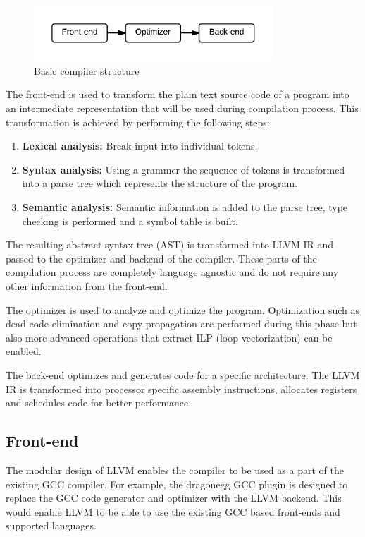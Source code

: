 \begin{figure}[ht]
\centering
\includegraphics[width=0.8\textwidth]{2_background/img/Basic_compiler.png}
\caption{Basic compiler structure}
\label{fig:compiler_structure}
\end{figure}

The front-end is used to transform the plain text source code of a program into an intermediate representation that will be used during compilation process. This transformation is achieved by performing the following steps:

\begin{enumerate}
	\item \textbf{Lexical analysis:} Break input into individual tokens.
	\item \textbf{Syntax analysis:} Using a grammer the sequence of tokens is transformed into a parse tree which represents the structure of the program.
	\item \textbf{Semantic analysis:} Semantic information is added to the parse tree, type checking is performed and a symbol table is built.
\end{enumerate}

The resulting abstract syntax tree (AST) is transformed into LLVM IR and passed to the optimizer and backend of the compiler. These parts of the compilation process are completely language agnostic and do not require any other information from the front-end.

The optimizer is used to analyze and optimize the program. Optimization such as dead code elimination and copy propagation are performed during this phase but also more advanced operations that extract ILP (loop vectorization) can be enabled.

The back-end optimizes and generates code for a specific architecture. The LLVM IR is transformed into processor specific assembly instructions, allocates registers and schedules code for better performance.

\subsection{Front-end}
The modular design of LLVM enables the compiler to be used as a part of the existing GCC compiler. For example, the dragonegg GCC plugin is designed to replace the GCC code generator and optimizer with the LLVM backend. This would enable LLVM to be able to use the existing GCC based front-ends and supported languages.

